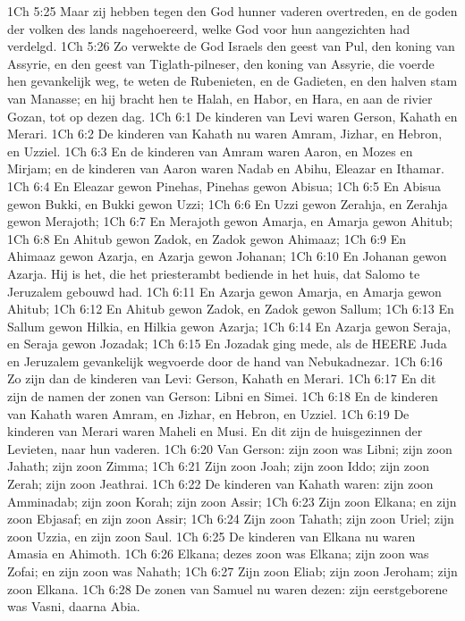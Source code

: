 1Ch 5:25  Maar zij hebben tegen den God hunner vaderen overtreden, en de goden der volken des lands nagehoereerd, welke God voor hun aangezichten had verdelgd.
1Ch 5:26  Zo verwekte de God Israels den geest van Pul, den koning van Assyrie, en den geest van Tiglath-pilneser, den koning van Assyrie, die voerde hen gevankelijk weg, te weten de Rubenieten, en de Gadieten, en den halven stam van Manasse; en hij bracht hen te Halah, en Habor, en Hara, en aan de rivier Gozan, tot op dezen dag.
1Ch 6:1  De kinderen van Levi waren Gerson, Kahath en Merari.
1Ch 6:2  De kinderen van Kahath nu waren Amram, Jizhar, en Hebron, en Uzziel.
1Ch 6:3  En de kinderen van Amram waren Aaron, en Mozes en Mirjam; en de kinderen van Aaron waren Nadab en Abihu, Eleazar en Ithamar.
1Ch 6:4  En Eleazar gewon Pinehas, Pinehas gewon Abisua;
1Ch 6:5  En Abisua gewon Bukki, en Bukki gewon Uzzi;
1Ch 6:6  En Uzzi gewon Zerahja, en Zerahja gewon Merajoth;
1Ch 6:7  En Merajoth gewon Amarja, en Amarja gewon Ahitub;
1Ch 6:8  En Ahitub gewon Zadok, en Zadok gewon Ahimaaz;
1Ch 6:9  En Ahimaaz gewon Azarja, en Azarja gewon Johanan;
1Ch 6:10  En Johanan gewon Azarja. Hij is het, die het priesterambt bediende in het huis, dat Salomo te Jeruzalem gebouwd had.
1Ch 6:11  En Azarja gewon Amarja, en Amarja gewon Ahitub;
1Ch 6:12  En Ahitub gewon Zadok, en Zadok gewon Sallum;
1Ch 6:13  En Sallum gewon Hilkia, en Hilkia gewon Azarja;
1Ch 6:14  En Azarja gewon Seraja, en Seraja gewon Jozadak;
1Ch 6:15  En Jozadak ging mede, als de HEERE Juda en Jeruzalem gevankelijk wegvoerde door de hand van Nebukadnezar.
1Ch 6:16  Zo zijn dan de kinderen van Levi: Gerson, Kahath en Merari.
1Ch 6:17  En dit zijn de namen der zonen van Gerson: Libni en Simei.
1Ch 6:18  En de kinderen van Kahath waren Amram, en Jizhar, en Hebron, en Uzziel.
1Ch 6:19  De kinderen van Merari waren Maheli en Musi. En dit zijn de huisgezinnen der Levieten, naar hun vaderen.
1Ch 6:20  Van Gerson: zijn zoon was Libni; zijn zoon Jahath; zijn zoon Zimma;
1Ch 6:21  Zijn zoon Joah; zijn zoon Iddo; zijn zoon Zerah; zijn zoon Jeathrai.
1Ch 6:22  De kinderen van Kahath waren: zijn zoon Amminadab; zijn zoon Korah; zijn zoon Assir;
1Ch 6:23  Zijn zoon Elkana; en zijn zoon Ebjasaf; en zijn zoon Assir;
1Ch 6:24  Zijn zoon Tahath; zijn zoon Uriel; zijn zoon Uzzia, en zijn zoon Saul.
1Ch 6:25  De kinderen van Elkana nu waren Amasia en Ahimoth.
1Ch 6:26  Elkana; dezes zoon was Elkana; zijn zoon was Zofai; en zijn zoon was Nahath;
1Ch 6:27  Zijn zoon Eliab; zijn zoon Jeroham; zijn zoon Elkana.
1Ch 6:28  De zonen van Samuel nu waren dezen: zijn eerstgeborene was Vasni, daarna Abia.
